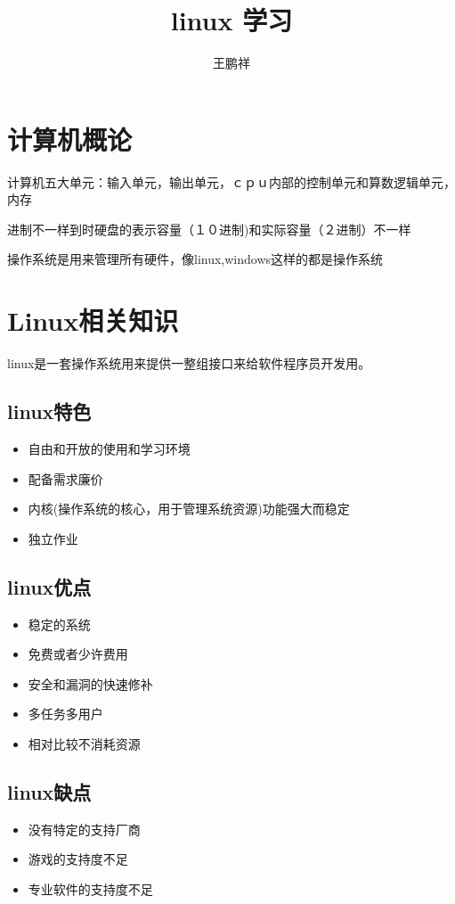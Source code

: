 \documentclass{article}
\begin{document}
\title{linux 学习}
\author{王鹏祥}
\date{\chntoday}
\maketitle
\tableofcontents
\newpage

\section{计算机概论}
计算机五大单元：输入单元，输出单元，ｃｐｕ内部的控制单元和算数逻辑单元，内存

进制不一样到时硬盘的表示容量（１０进制)和实际容量（２进制）不一样

操作系统是用来管理所有硬件，像linux,windows这样的都是操作系统

\section{Linux相关知识}
linux是一套操作系统用来提供一整组接口来给软件程序员开发用。

\subsection{linux特色}
\begin{itemize}
\item 自由和开放的使用和学习环境
\item 配备需求廉价
\item 内核(操作系统的核心，用于管理系统资源)功能强大而稳定
\item 独立作业
\end{itemize}

\subsection{linux优点}
\begin{itemize}
\item 稳定的系统
\item 免费或者少许费用
\item 安全和漏洞的快速修补
\item 多任务多用户
\item 相对比较不消耗资源
\end{itemize}

\subsection{linux缺点}
\begin{itemize}
\item 没有特定的支持厂商
\item 游戏的支持度不足
\item 专业软件的支持度不足
\end{itemize}
\end{document}
